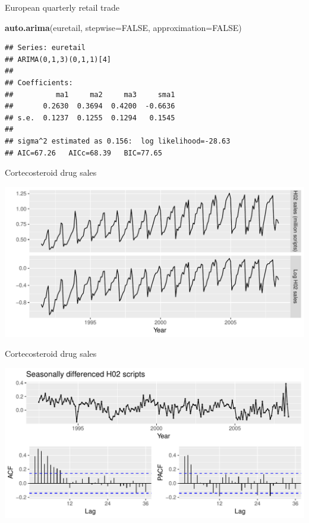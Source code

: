 \documentclass[14pt,ignorenonframetext,]{beamer}
\newenvironment{Shaded}{\begin{snugshade}}{\end{snugshade}}
\newcommand{\KeywordTok}[1]{\textcolor[rgb]{0.13,0.29,0.53}{\textbf{#1}}}
\newcommand{\DataTypeTok}[1]{\textcolor[rgb]{0.13,0.29,0.53}{#1}}
\newcommand{\OtherTok}[1]{\textcolor[rgb]{0.56,0.35,0.01}{#1}}
\newcommand{\NormalTok}[1]{#1}
\begin{document}
\begin{frame}[fragile]{European quarterly retail trade}

\fontsize{12}{14}\sf

\begin{Shaded}
\begin{Highlighting}[]
\KeywordTok{auto.arima}\NormalTok{(euretail, }
  \DataTypeTok{stepwise=}\OtherTok{FALSE}\NormalTok{, }\DataTypeTok{approximation=}\OtherTok{FALSE}\NormalTok{)}
\end{Highlighting}
\end{Shaded}

\begin{verbatim}
## Series: euretail 
## ARIMA(0,1,3)(0,1,1)[4] 
## 
## Coefficients:
##          ma1     ma2     ma3     sma1
##       0.2630  0.3694  0.4200  -0.6636
## s.e.  0.1237  0.1255  0.1294   0.1545
## 
## sigma^2 estimated as 0.156:  log likelihood=-28.63
## AIC=67.26   AICc=68.39   BIC=77.65
\end{verbatim}

\end{frame}

\begin{frame}{Cortecosteroid drug sales}

\includegraphics{week_5_arima_files/figure-beamer/h02-1.pdf}

\end{frame}

\begin{frame}{Cortecosteroid drug sales}

\includegraphics{week_5_arima_files/figure-beamer/h02b-1.pdf}

\end{frame}
\end{document}
